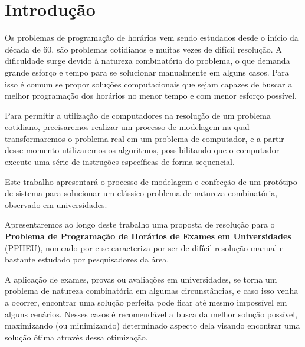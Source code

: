 \chapter*[Introdução]{Introdução}
\setcounter{chapter}{1}
\pagestyle{simple}



Os problemas de programação de horários vem sendo estudados desde o início da década de 60, são problemas cotidianos e muitas vezes de difícil resolução. A dificuldade surge devido à natureza combinatória do problema, o que demanda grande esforço e tempo para se solucionar manualmente em alguns casos. Para isso é comum se propor soluções computacionais que sejam capazes de buscar a melhor programação dos horários no menor tempo e com menor esforço possível.

Para permitir a utilização de computadores na resolução de um problema cotidiano, precisaremos realizar um processo de modelagem na qual transformaremos o problema real em um problema de computador, e a partir desse momento utilizaremos os algoritmos, possibilitando que o computador execute uma série de instruções específicas de forma sequencial. 

Este trabalho apresentará o processo de modelagem e confecção de um protótipo de sistema para solucionar um clássico problema de natureza combinatória, observado em universidades.

Apresentaremos ao longo deste trabalho uma proposta de resolução para o \textbf{Problema de Programação de Horários de Exames em Universidades} (PPHEU), nomeado por  e se caracteriza por ser de difícil resolução manual e bastante estudado por pesquisadores da área.

A aplicação de exames, provas ou avaliações em universidades, se torna um problema de natureza combinatória em algumas circunstâncias, e caso isso venha a ocorrer, encontrar uma solução perfeita pode ficar até mesmo impossível em alguns cenários. Nesses casos é recomendável a busca da melhor solução possível, maximizando (ou minimizando) determinado aspecto dela visando encontrar uma solução ótima através dessa otimização.

